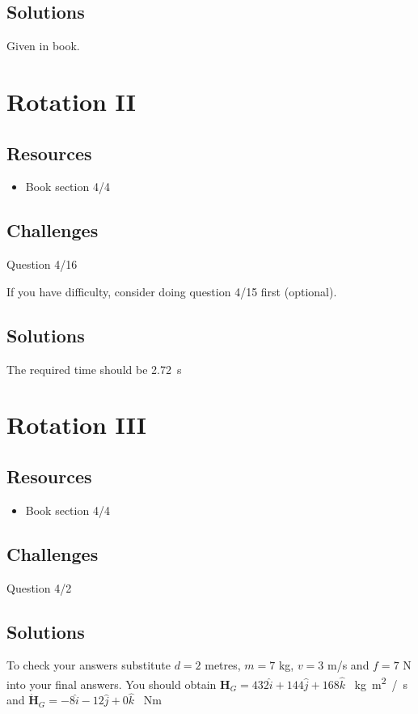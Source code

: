 \subsection*{Solutions}
Given in book.




\newpage
\section{Rotation II}

\subsection*{Resources}
\begin{itemize}
    \item Book section 4/4
\end{itemize}

\subsection*{Challenges}
Question 4/16

If you have difficulty, consider doing question 4/15 first (optional).

\subsection*{Solutions}
The required time should be \SI{2.72}{s}




\iffalse
\newpage
\section{Rotation III}

\subsection*{Resources}
\begin{itemize}
    \item Book section 4/4
\end{itemize}

\subsection*{Challenges}
Question 4/2

\subsection*{Solutions}
To check your answers substitute $d=2$ metres, $m=7$ kg, $v=3$ m/s and $f=7$ N into your final answers.
You should obtain
$\bm{H}_G = 432 \hat{i} + 144 \hat{j} + 168 \hat{k}$ \SI{}{kg m^2 /s}
and
$\dot{\bm{H}}_G = -8 \hat{i} - 12 \hat{j} + 0 \hat{k}$ \SI{}{Nm}




